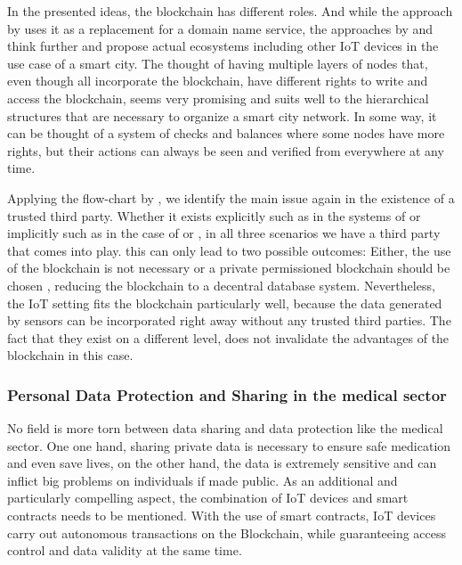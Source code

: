 In the presented ideas, the blockchain has different roles. And while the approach by \cite{Rowan2017} uses it as a replacement for a domain name service, the approaches by \cite{DorriSteger2017} and \cite{Sharma2017} think further and propose actual ecosystems including other IoT devices in the use case of a smart city.
The thought of having multiple layers of nodes that, even though all incorporate the blockchain, have different rights to write and access the blockchain, seems very promising and suits well to the hierarchical structures that are necessary to organize a smart city network. In some way, it can be thought of a system of checks and balances where some nodes have more rights, but their actions can always be seen and verified from everywhere at any time.

Applying the flow-chart by \citeauthor{Wust2017}, we identify the main issue again in the existence of a trusted third party. Whether it exists explicitly such as in the systems of \cite{Sharma2017} or implicitly such as in the case of \cite{Rowan2017} or \cite{DorriSteger2017}, in all three scenarios we have a third party that comes into play. 
\citeauthor{Wust2017} this can only lead to two possible outcomes: Either, the use of the blockchain is not necessary or a private permissioned blockchain should be chosen \cite{Wust2017}, reducing the blockchain to a decentral database system.
Nevertheless, the IoT setting fits the blockchain particularly well, because the data generated by sensors can be incorporated right away without any trusted third parties. The fact that they exist on a different level, does not invalidate the advantages of the blockchain in this case.

\subsubsection{Personal Data Protection and Sharing in the medical sector}
No field is more torn between data sharing and data protection like the medical sector. One one hand, sharing private data is necessary to ensure safe medication and even save lives, on the other hand, the data is extremely sensitive and can inflict big problems on individuals if made public.
As an additional and particularly compelling aspect, the combination of IoT devices and smart contracts needs to be mentioned. With the use of smart contracts, IoT devices carry out autonomous transactions on the Blockchain, while guaranteeing access control and data validity at the same time.

